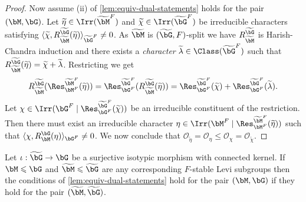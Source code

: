 \documentclass[eqthmnum,nocolour,skinny]{jt-calcs}
\begin{document}
\begin{proof}
Now assume (ii) of \cref{lem:equiv-dual-statements} holds for the pair $(\bM,\bG)$. Let $\widetilde{\eta} \in \Irr(\widetilde{\bM}^F)$ and $\widetilde{\chi} \in \Irr(\widetilde{\bG}^F)$ be irreducible characters satisfying $\langle \widetilde{\chi}, R_{\widetilde{\bM}}^{\widetilde{\bG}}(\widetilde{\eta})\rangle_{\widetilde{\bG}^F} \neq 0$. As $\widetilde{\bM}$ is $(\widetilde{\bG},F)$-split we have $R_{\widetilde{\bM}}^{\widetilde{\bG}}$ is Harish-Chandra induction and there exists a \emph{character} $\widetilde{\lambda} \in \Class(\widetilde{\bG}^F)$ such that $R_{\widetilde{\bM}}^{\widetilde{\bG}}(\widetilde{\eta}) = \widetilde{\chi} + \widetilde{\lambda}$. Restricting we get
\begin{equation*}
R_{\widetilde{\bM}}^{\widetilde{\bG}}(\Res_{\bM^F}^{\widetilde{\bM}^F}(\widetilde{\eta})) = \Res_{\bG^F}^{\widetilde{\bG}^F}(R_{\widetilde{\bM}}^{\widetilde{\bG}}(\widetilde{\eta})) = \Res_{\bG^F}^{\widetilde{\bG}^F}(\widetilde{\chi}) + \Res_{\bG^F}^{\widetilde{\bG}^F}(\widetilde{\lambda}).
\end{equation*}
Let $\chi \in \Irr(\bG^F \mid \Res_{\bG^F}^{\widetilde{\bG}^F}(\widetilde{\chi}))$ be an irreducible constituent of the restriction. Then there must exist an irreducible character $\eta \in \Irr(\bM^F \mid \Res_{\bM^F}^{\widetilde{\bM}^F}(\widetilde{\eta}))$ such that $\langle \chi, R_{\bM}^{\bG}(\eta) \rangle_{\bG^F} \neq 0$. We now conclude that $\mathcal{O}_{\widetilde{\eta}} = \mathcal{O}_{\eta} \leqslant \mathcal{O}_{\chi} = \mathcal{O}_{\widetilde{\chi}}$.
\end{proof}

\begin{lem}\label{lem:red-smooth-covering}
Let $\iota : \widetilde{\bG} \to \bG$ be a surjective isotypic morphism with connected kernel. If $\bM \leqslant \bG$ and $\widetilde{\bM} \leqslant \widetilde{\bG}$ are any corresponding $F$-stable Levi subgroups then the conditions of \cref{lem:equiv-dual-statements} hold for the pair $(\bM,\bG)$ if they hold for the pair $(\widetilde{\bM},\widetilde{\bG})$.
\end{lem}
\end{document}
